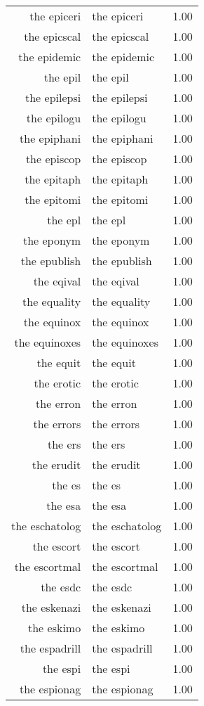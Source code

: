 \begin{table}[ht]
\begin{tabular}{rlr}
  the epiceri & the epiceri & 1.00 \\ 
  the epicscal & the epicscal & 1.00 \\ 
  the epidemic & the epidemic & 1.00 \\ 
  the epil & the epil & 1.00 \\ 
  the epilepsi & the epilepsi & 1.00 \\ 
  the epilogu & the epilogu & 1.00 \\ 
  the epiphani & the epiphani & 1.00 \\ 
  the episcop & the episcop & 1.00 \\ 
  the epitaph & the epitaph & 1.00 \\ 
  the epitomi & the epitomi & 1.00 \\ 
  the epl & the epl & 1.00 \\ 
  the eponym & the eponym & 1.00 \\ 
  the epublish & the epublish & 1.00 \\ 
  the eqival & the eqival & 1.00 \\ 
  the equality & the equality & 1.00 \\ 
  the equinox & the equinox & 1.00 \\ 
  the equinoxes & the equinoxes & 1.00 \\ 
  the equit & the equit & 1.00 \\ 
  the erotic & the erotic & 1.00 \\ 
  the erron & the erron & 1.00 \\ 
  the errors & the errors & 1.00 \\ 
  the ers & the ers & 1.00 \\ 
  the erudit & the erudit & 1.00 \\ 
  the es & the es & 1.00 \\ 
  the esa & the esa & 1.00 \\ 
  the eschatolog & the eschatolog & 1.00 \\ 
  the escort & the escort & 1.00 \\ 
  the escortmal & the escortmal & 1.00 \\ 
  the esdc & the esdc & 1.00 \\ 
  the eskenazi & the eskenazi & 1.00 \\ 
  the eskimo & the eskimo & 1.00 \\ 
  the espadrill & the espadrill & 1.00 \\ 
  the espi & the espi & 1.00 \\ 
  the espionag & the espionag & 1.00 \\ 

\end{tabular}
\end{table}
